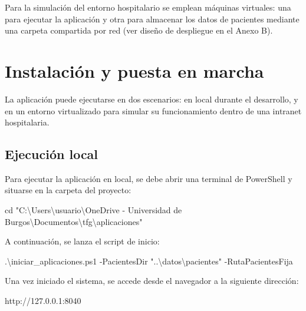 \documentclass[
  spanish,
  a4paper,
  12pt,
  twoside]{memoir}
\newenvironment{Shaded}{\begin{snugshade}}{\end{snugshade}}
\newcommand{\FunctionTok}[1]{\textcolor[rgb]{0.28,0.35,0.67}{#1}}
\newcommand{\NormalTok}[1]{\textcolor[rgb]{0.00,0.23,0.31}{#1}}
\newcommand{\OperatorTok}[1]{\textcolor[rgb]{0.37,0.37,0.37}{#1}}
\newcommand{\StringTok}[1]{\textcolor[rgb]{0.13,0.47,0.30}{#1}}
\begin{document}
Para la simulación del entorno hospitalario se emplean máquinas
virtuales: una para ejecutar la aplicación y otra para almacenar los
datos de pacientes mediante una carpeta compartida por red (ver diseño
de despliegue en el Anexo B).

\chapter{Instalación y puesta en
marcha}\label{instalaciuxf3n-y-puesta-en-marcha}

La aplicación puede ejecutarse en dos escenarios: en local durante el
desarrollo, y en un entorno virtualizado para simular su funcionamiento
dentro de una intranet hospitalaria.

\section{Ejecución local}\label{ejecuciuxf3n-local}

Para ejecutar la aplicación en local, se debe abrir una terminal de
PowerShell y situarse en la carpeta del proyecto:

\begin{Shaded}
\begin{Highlighting}[]
\FunctionTok{cd} \StringTok{"C:\textbackslash{}Users\textbackslash{}usuario\textbackslash{}OneDrive {-} Universidad de Burgos\textbackslash{}Documentos\textbackslash{}tfg\textbackslash{}aplicaciones"}
\end{Highlighting}
\end{Shaded}

A continuación, se lanza el script de inicio:

\begin{Shaded}
\begin{Highlighting}[]
\OperatorTok{.}\NormalTok{\textbackslash{}iniciar\_aplicaciones}\OperatorTok{.}\FunctionTok{ps1} \OperatorTok{{-}}\NormalTok{PacientesDir }\StringTok{"..\textbackslash{}datos\textbackslash{}pacientes"} \OperatorTok{{-}}\NormalTok{RutaPacientesFija}
\end{Highlighting}
\end{Shaded}

Una vez iniciado el sistema, se accede desde el navegador a la siguiente
dirección:

\begin{Shaded}
\begin{Highlighting}[]
\NormalTok{http://127.0.0.1:8040}
\end{Highlighting}
\end{Shaded}
\end{document}
